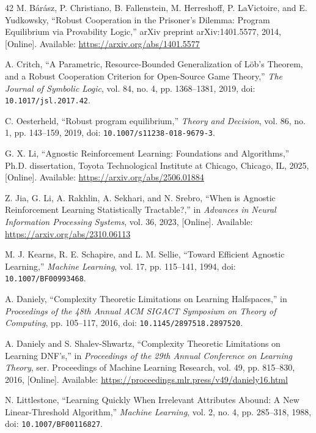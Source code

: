 \begin{thebibliography}{42}
M. B\'{a}r\'{a}sz, P. Christiano, B. Fallenstein, M. Herreshoff, P. LaVictoire, and E. Yudkowsky, ``Robust Cooperation in the Prisoner's Dilemma: Program Equilibrium via Provability Logic,'' arXiv preprint arXiv:1401.5577, 2014, [Online]. Available: \url{https://arxiv.org/abs/1401.5577}

A. Critch, ``A Parametric, Resource-Bounded Generalization of L\"{o}b's Theorem, and a Robust Cooperation Criterion for Open-Source Game Theory,'' \emph{The Journal of Symbolic Logic}, vol. 84, no. 4, pp. 1368--1381, 2019, doi: \nolinkurl{10.1017/jsl.2017.42}.

C. Oesterheld, ``Robust program equilibrium,'' \emph{Theory and Decision}, vol. 86, no. 1, pp. 143--159, 2019, doi: \nolinkurl{10.1007/s11238-018-9679-3}.

G. X. Li, ``Agnostic Reinforcement Learning: Foundations and Algorithms,'' Ph.D. dissertation, Toyota Technological Institute at Chicago, Chicago, IL, 2025, [Online]. Available: \url{https://arxiv.org/abs/2506.01884}

Z. Jia, G. Li, A. Rakhlin, A. Sekhari, and N. Srebro, ``When is Agnostic Reinforcement Learning Statistically Tractable?,'' in \emph{Advances in Neural Information Processing Systems}, vol. 36, 2023, [Online]. Available: \url{https://arxiv.org/abs/2310.06113}

M. J. Kearns, R. E. Schapire, and L. M. Sellie, ``Toward Efficient Agnostic Learning,'' \emph{Machine Learning}, vol. 17, pp. 115--141, 1994, doi: \nolinkurl{10.1007/BF00993468}.

A. Daniely, ``Complexity Theoretic Limitations on Learning Halfspaces,'' in \emph{Proceedings of the 48th Annual ACM SIGACT Symposium on Theory of Computing}, pp. 105--117, 2016, doi: \nolinkurl{10.1145/2897518.2897520}.

A. Daniely and S. Shalev-Shwartz, ``Complexity Theoretic Limitations on Learning DNF's,'' in \emph{Proceedings of the 29th Annual Conference on Learning Theory}, ser. Proceedings of Machine Learning Research, vol. 49, pp. 815--830, 2016, [Online]. Available: \url{https://proceedings.mlr.press/v49/daniely16.html}

N. Littlestone, ``Learning Quickly When Irrelevant Attributes Abound: A New Linear-Threshold Algorithm,'' \emph{Machine Learning}, vol. 2, no. 4, pp. 285--318, 1988, doi: \nolinkurl{10.1007/BF00116827}.


\end{thebibliography}
